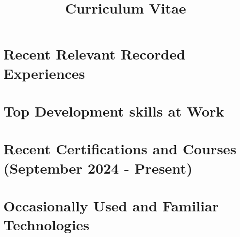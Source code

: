 \documentclass[13.12pt,a4paper,sans,colorlinks,urlcolor=violet, hyperindex,plainpages=false,bookmarksopen,bookmarksnumbered,pdfusetitle]{moderncv}
\title{Curriculum Vitae}
\begin{document}
\hypersetup{urlcolor=violet}

\makecvtitle
\vspace{-3em}



\vspace{-1em}

\section{Recent Relevant Recorded Experiences}


\vspace{0.5em}



\section{Top Development skills at \textbf{Work}}


\section{Recent Certifications and Courses (September 2024 - Present)}


\section{Occasionally Used and Familiar Technologies}


\end{document}
